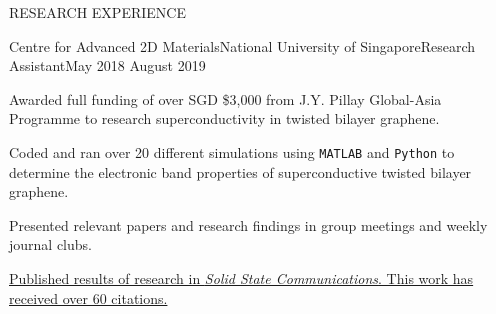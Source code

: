 \documentclass{resume} %
\begin{document}
\begin{rSection}{RESEARCH EXPERIENCE}
\begin{rSubsection}{Centre for Advanced 2D Materials}{National University of Singapore}{Research Assistant}{May 2018 {\textendash} August 2019}
\item Awarded full funding of over SGD \$3,000 from J.Y. Pillay Global-Asia Programme to research superconductivity in twisted bilayer graphene.
\item Coded and ran over 20 different simulations using \texttt{MATLAB} and \texttt{Python} to determine the electronic band properties of superconductive twisted bilayer graphene.
\item Presented relevant papers and research findings in group meetings and weekly journal clubs.
\item \href{https://doi.org/10.1016/j.ssc.2018.07.013} {Published results of research in \textit{Solid State Communications}. This work has received over 60 citations.}
\end{rSubsection}

\newpage










\end{rSection}
\end{document}
